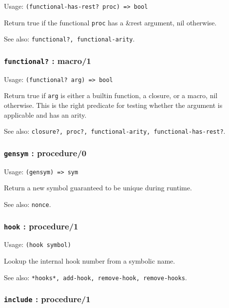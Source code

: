 \documentclass[
]{article}
\newcommand{\passthrough}[1]{#1}
\begin{document}
Usage: \passthrough{\lstinline!(functional-has-rest? proc) => bool!}

Return true if the functional \passthrough{\lstinline!proc!} has a
\&rest argument, nil otherwise.

See also: \passthrough{\lstinline!functional?, functional-arity!}.

\hypertarget{functional-macro1}{%
\subsubsection{\texorpdfstring{\texttt{functional?} :
macro/1}{functional? : macro/1}}\label{functional-macro1}}

Usage: \passthrough{\lstinline!(functional? arg) => bool!}

Return true if \passthrough{\lstinline!arg!} is either a builtin
function, a closure, or a macro, nil otherwise. This is the right
predicate for testing whether the argument is applicable and has an
arity.

See also:
\passthrough{\lstinline!closure?, proc?, functional-arity, functional-has-rest?!}.

\hypertarget{gensym-procedure0}{%
\subsubsection{\texorpdfstring{\texttt{gensym} :
procedure/0}{gensym : procedure/0}}\label{gensym-procedure0}}

Usage: \passthrough{\lstinline!(gensym) => sym!}

Return a new symbol guaranteed to be unique during runtime.

See also: \passthrough{\lstinline!nonce!}.

\hypertarget{hook-procedure1}{%
\subsubsection{\texorpdfstring{\texttt{hook} :
procedure/1}{hook : procedure/1}}\label{hook-procedure1}}

Usage: \passthrough{\lstinline!(hook symbol)!}

Lookup the internal hook number from a symbolic name.

See also:
\passthrough{\lstinline!*hooks*, add-hook, remove-hook, remove-hooks!}.

\hypertarget{include-procedure1}{%
\subsubsection{\texorpdfstring{\texttt{include} :
procedure/1}{include : procedure/1}}\label{include-procedure1}}
\end{document}
